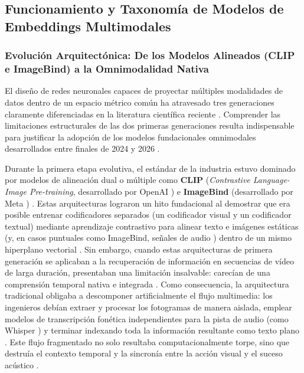 
\subsection{Funcionamiento y Taxonomía de Modelos de Embeddings Multimodales}
\label{subsec:taxonomia_modelos}

\subsubsection{Evolución Arquitectónica: De los Modelos Alineados (CLIP e ImageBind) a la Omnimodalidad Nativa}
\label{subsubsec:evolucion_clip_omnimodalidad}

El diseño de redes neuronales capaces de proyectar múltiples modalidades de datos dentro de un espacio métrico común ha atravesado tres generaciones claramente diferenciadas en la literatura científica reciente \cite{prajwal2025multimodal, qwen3_vl_emb2026}. Comprender las limitaciones estructurales de las dos primeras generaciones resulta indispensable para justificar la adopción de los modelos fundacionales omnimodales desarrollados entre finales de 2024 y 2026 \cite{gemini_emb2_docs, qwen3_vl_emb2026}.

Durante la primera etapa evolutiva, el estándar de la industria estuvo dominado por modelos de alineación dual o múltiple como \textbf{CLIP} (\textit{Contrastive Language-Image Pre-training}, desarrollado por OpenAI \cite{radford2021clip}) e \textbf{ImageBind} (desarrollado por Meta \cite{girdhar2023imagebind}) \cite{prajwal2025multimodal}. Estas arquitecturas lograron un hito fundacional al demostrar que era posible entrenar codificadores separados (un codificador visual y un codificador textual) mediante aprendizaje contrastivo \cite{radford2021clip, vandenoord2018cpc} para alinear texto e imágenes estáticas (y, en casos puntuales como ImageBind, señales de audio \cite{girdhar2023imagebind}) dentro de un mismo hiperplano vectorial \cite{prajwal2025multimodal}. Sin embargo, cuando estas arquitecturas de primera generación se aplicaban a la recuperación de información en secuencias de vídeo de larga duración, presentaban una limitación insalvable: carecían de una comprensión temporal nativa e integrada \cite{prajwal2025multimodal, rethinking_long_video2026}. Como consecuencia, la arquitectura tradicional obligaba a descomponer artificialmente el flujo multimedia: los ingenieros debían extraer y procesar los fotogramas de manera aislada, emplear modelos de transcripción fonética independientes para la pista de audio (como Whisper \cite{radford2023whisper}) y terminar indexando toda la información resultante como texto plano \cite{video_rag2024}. Este flujo fragmentado no solo resultaba computacionalmente torpe, sino que destruía el contexto temporal y la sincronía entre la acción visual y el suceso acústico \cite{prajwal2025multimodal}.

